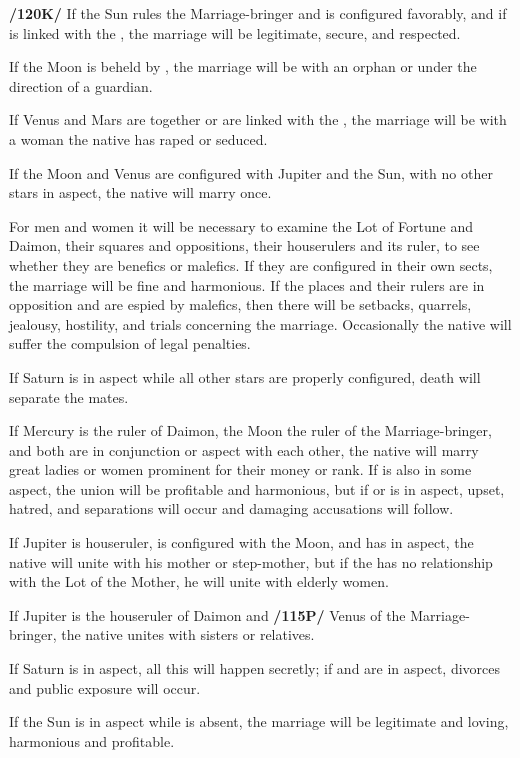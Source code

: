 \textbf{/120K/} If the Sun rules the Marriage-bringer and is configured favorably, and if \Jupiter\xspace is linked with the \Moon, the marriage will be legitimate, secure, and respected. 

If the Moon is beheld by \Saturn, the marriage will be with an orphan or under the direction of a guardian. 

If Venus and Mars are together or are linked with the \Moon, the marriage will be with a woman the native has raped or seduced. 

If the Moon and Venus are configured with Jupiter and the Sun, with no other stars in aspect, the native will marry once.

For men and women it will be necessary to examine the Lot of Fortune and Daimon, their squares and oppositions, their houserulers and its ruler, to see whether they are benefics or malefics. If they are configured in their own sects, the marriage will be fine and harmonious. If the places and their rulers are in opposition and are espied by malefics, then there will be setbacks, quarrels, jealousy, hostility, and trials concerning the marriage. Occasionally the native will suffer the compulsion of legal penalties. 

If Saturn is in aspect while all other stars are properly configured, death will separate the mates. 

If Mercury is the ruler of Daimon, the Moon the ruler of the Marriage-bringer, and both are in conjunction or aspect with each other, the native will marry great ladies or women prominent for their money or rank. If \Jupiter\xspace is also in some aspect, the union will be profitable and harmonious, but if \Saturn\xspace or \Mars\xspace is in aspect, upset, hatred, and separations will occur and damaging accusations will follow. 

If Jupiter is houseruler, is configured with the Moon, and has \Saturn\xspace in aspect, the native will unite with his mother or step-mother, but if the \Moon\xspace has no relationship with the Lot of the Mother, he will unite with elderly women. 

If Jupiter is the houseruler of Daimon and \textbf{/115P/} Venus of the Marriage-bringer, the native unites with sisters or relatives.

If Saturn is in aspect, all this will happen secretly; if \Mercury\xspace and \Mars\xspace are in aspect, divorces and public exposure will occur. 

If the Sun is in aspect while \Saturn\xspace is absent, the marriage will be legitimate and loving, harmonious and profitable. 

